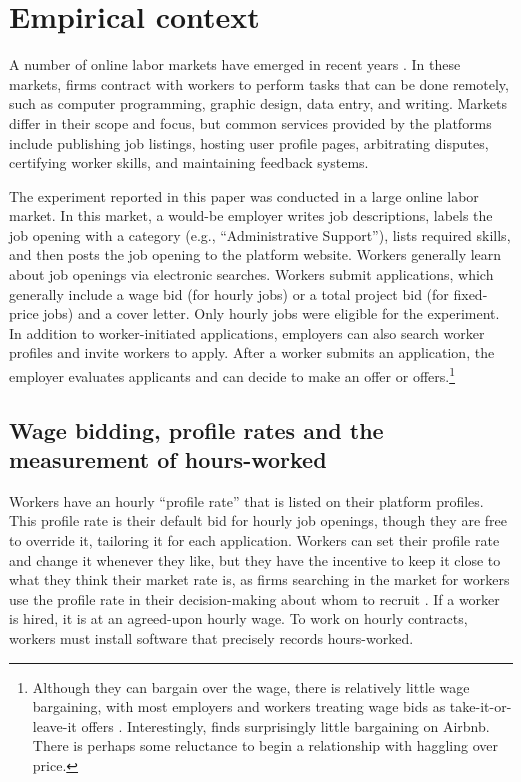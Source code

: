 \documentclass[AER]{AEA}
\begin{document}
\section{Empirical context} \label{sec:empirical_context} 

A number of online labor markets have emerged in recent years \citep{Horton2010, agrawal2015digitization}. 
In these markets, firms contract with workers to perform tasks that can be done remotely, such as computer programming, graphic design, data entry, and writing. 
Markets differ in their scope and focus, but common services provided by the platforms include publishing job listings, hosting user profile pages, arbitrating disputes, certifying worker skills, and maintaining feedback systems. 

The experiment reported in this paper was conducted in a large online labor market.  
In this market, a would-be employer writes job descriptions, labels the job opening with a category (e.g., ``Administrative Support''), lists required skills, and then posts the job opening to the platform website. 
Workers generally learn about job openings via electronic searches. 
Workers submit applications, which generally include a wage bid (for hourly jobs) or a total project bid (for fixed-price jobs) and a cover letter.
Only hourly jobs were eligible for the experiment.
In addition to worker-initiated applications, employers can also search worker profiles and invite workers to apply. 
After a worker submits an application, the employer evaluates applicants and can decide to make an offer or offers.\footnote{
      Although they can bargain over the wage, there is relatively little wage bargaining, with most employers and workers treating wage bids as take-it-or-leave-it offers \citep{barach2017}. 
      Interestingly, \cite{fradkin2016} finds surprisingly little bargaining on Airbnb. 
      There is perhaps some reluctance to begin a relationship with haggling over price. 
}

\subsection{Wage bidding, profile rates and the measurement of hours-worked} \label{sec:profile_rates}

Workers have an hourly ``profile rate'' that is listed on their platform profiles. 
This profile rate is their default bid for hourly job openings, though they are free to override it, tailoring it for each application.
Workers can set their profile rate and change it whenever they like, but they have the incentive to keep it close to what they think their market rate is, as firms searching in the market for workers use the profile rate in their decision-making about whom to recruit \citep{horton2019buyer}. 
If a worker is hired, it is at an agreed-upon hourly wage.
To work on hourly contracts, workers must install software that precisely records hours-worked.
\end{document}

